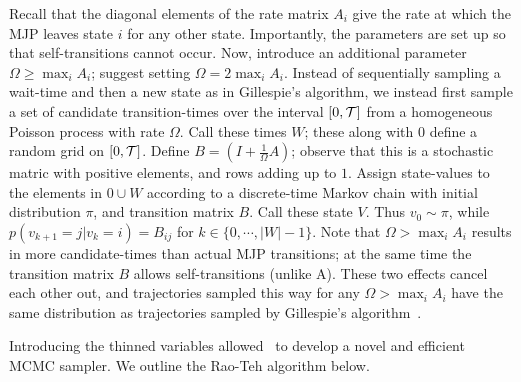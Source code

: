Recall that the diagonal elements of the rate matrix $A_i$ give the 
rate at which the MJP leaves state $i$ for any other state. Importantly,
the parameters are set up so that self-transitions cannot occur. 
Now, introduce an additional parameter $\Omega \ge \max_i A_i$;
\cite{RaoTeh13} suggest setting $\Omega = 2 \max_i A_i$. 
Instead of sequentially sampling a wait-time and then a new state as
in Gillespie's algorithm, we instead first sample a set of candidate
transition-times over the interval $[0,{\mathcal T}]$ from a homogeneous Poisson process 
with rate $\Omega$. Call these times $W$; these along with $0$ define a
random grid on $[0,{\mathcal T}]$.
Define $B = \left(I +\frac{1}{\Omega}A\right)$; observe that this is a
stochastic matric with positive elements, and rows adding up to $1$.
Assign state-values to the elements in $0 \cup W$ according to a discrete-time 
Markov chain with initial distribution $\pi$, and transition matrix $B$.
Call these state $V$. Thus $v_0 \sim \pi$, while $p(v_{k+1}=j|v_k=i) = B_{ij}$
for $k \in \{0,\cdots,|W|-1\}$.
Note that $\Omega > \max_i A_i$ results in more
candidate-times than actual MJP transitions; at the same time the transition
matrix $B$ allows self-transitions (unlike A). These two effects cancel
each other out, and trajectories sampled this way for any $\Omega > \max_i A_i$
have the same distribution as trajectories
sampled by Gillespie's algorithm~\cite{Jen1953,RaoTeh13}.

Introducing the thinned variables allowed~\cite{RaoTeh13} to develop
a novel and efficient MCMC sampler. We outline the Rao-Teh algorithm below.

